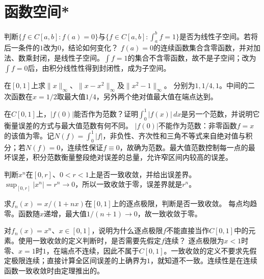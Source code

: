 \par\addvspace{12pt}

\section{函数空间*}

判断\(\{f\in C[a,b]:f(a)=0\}\)与\(\{f\in C[a,b]:\int_a^b f=1\}\)是否为线性子空间。若将后一条件的\(1\)改为\(0\)，结论如何变化？
\solutionanswer
\(f(a)=0\)的连续函数集合含零函数，并对加法、数乘封闭，是线性子空间。\(\int f=1\)的集合不含零函数，故不是子空间；改为\(\int f=0\)后，由积分线性性得到封闭性，成为子空间。


在\([0,1]\)上求\(\|x\|_\infty\)、\(\|x-x^2\|_\infty\)及\(\|x^2-1\|_\infty\)。
\solutionanswer
分别为\(1,1/4,1\)。中间的二次函数在\(x=1/2\)取最大值\(1/4\)，另外两个绝对值最大值在端点达到。


在\(C[0,1]\)上，\(|f(0)|\)能否作为范数？证明\(\int_0^1|f(x)|\,dx\)是另一个范数，并说明它衡量误差的方式与最大值范数有何不同。
\solutionanswer
\(|f(0)|\)不能作为范数：非零函数\(f=x\)的该值为零。记\(N(f)=\int_0^1|f|\)，非负性、齐次性和三角不等式来自绝对值与积分；若\(N(f)=0\)，连续性保证\(f\equiv0\)，故确为范数。最大值范数控制每一点的最坏误差，积分范数衡量整段绝对误差的总量，允许窄区间内较高的误差。


判断\(x^n\)在\([0,r]\)、\(0<r<1\)上是否一致收敛，并给出误差界。
\solutionanswer
\(\sup_{[0,r]}|x^n|=r^n\to0\)，所以一致收敛于零，误差界就是\(r^n\)。


求\(f_n(x)=x/(1+nx)\)在\([0,1]\)上的逐点极限，判断是否一致收敛。
\solutionanswer
每点均趋零。函数随\(x\)递增，最大值\(1/(n+1)\to0\)，故一致收敛于零。


对\(f_n(x)=x^n\)、\(x\in[0,1]\)，说明为什么逐点极限\(f\)不能直接当作\(C[0,1]\)中的元素。使用一致收敛的定义判断时，是否需要先假定\(f\)连续？
\solutionanswer
逐点极限为\(x<1\)时零、\(x=1\)时\(1\)，在端点不连续，因此不属于\(C[0,1]\)。一致收敛的定义不要求先假定极限连续；直接计算全区间误差的上确界为\(1\)，就知道不一致。连续性是在连续函数一致收敛时由定理推出的。


